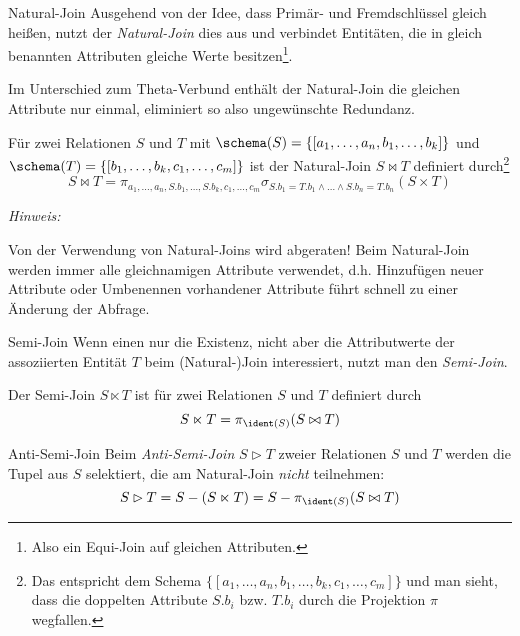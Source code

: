 \begin{defi}{Natural-Join}
    Ausgehend von der Idee, dass Primär- und Fremdschlüssel gleich heißen, nutzt der \emph{Natural-Join} dies aus und verbindet Entitäten, die in gleich benannten Attributen gleiche Werte besitzen\footnote{Also ein Equi-Join auf gleichen Attributen.}.

    Im Unterschied zum Theta-Verbund enthält der Natural-Join die gleichen Attribute nur einmal, eliminiert so also ungewünschte Redundanz.

    Für zwei Relationen $S$ und $T$ mit $\schema(S) = \{ [ a_1, \ldots, a_n, b_1, \ldots, b_k ] \}$ und $\schema(T) = \{ [ b_1, \ldots, b_k, c_1, \ldots, c_m ] \}$ ist der Natural-Join $S \bowtie T$ definiert durch\footnote{Das entspricht dem Schema $\{ [a_1, \ldots, a_n, b_1, \ldots, b_k, c_1, \ldots, c_m] \}$ und man sieht, dass die doppelten Attribute $S.b_i$ bzw. $T.b_i$ durch die Projektion $\pi$ wegfallen.}
    \[
        S \bowtie T = \pi_{a_1, \ldots, a_n, S.b_1, \ldots, S.b_k, c_1, \ldots, c_m} \sigma_{S.b_1 = T.b_1 \land \ldots \land S.b_n = T.b_n} (S \times T)
    \]

    \emph{Hinweis:}

    Von der Verwendung von Natural-Joins wird abgeraten!
    Beim Natural-Join werden immer alle gleichnamigen Attribute verwendet, d.h. Hinzufügen neuer Attribute oder Umbenennen vorhandener Attribute führt schnell zu einer Änderung der Abfrage.
\end{defi}

\begin{bonus}{Semi-Join}
    Wenn einen nur die Existenz, nicht aber die Attributwerte der assoziierten Entität $T$ beim (Natural-)Join interessiert, nutzt man den \emph{Semi-Join}.

    Der Semi-Join $S \ltimes T$ ist für zwei Relationen $S$ und $T$ definiert durch
    \[
        S \ltimes T = \pi_{\ident(S)} (S \bowtie T)
    \]
\end{bonus}

\begin{bonus}{Anti-Semi-Join}
    Beim \emph{Anti-Semi-Join} $S \rhd T$ zweier Relationen $S$ und $T$ werden die Tupel aus $S$ selektiert, die am Natural-Join \emph{nicht} teilnehmen:
    \[
        S \rhd T = S - (S \ltimes T) = S - \pi_{\ident(S)} (S \bowtie T)
    \]
\end{bonus}

